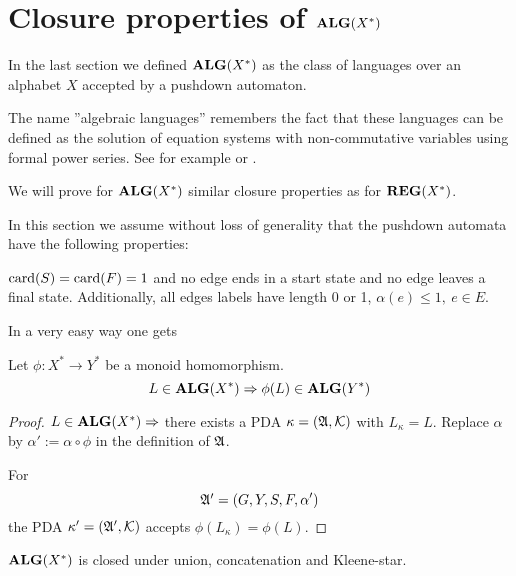 \section{Closure properties of $\mbox{{\bf ALG}}(X^*)$}

In the last section we defined $\mbox{{\bf ALG}}(X^*)$ as the class of languages over an
alphabet $X$ accepted by a pushdown automaton.

The name ''algebraic languages'' remembers the fact that these languages can be
defined as the solution of equation systems with non-commutative variables using
formal power series. See for example \cite{SaSo} or \cite{Berstel77}.

We will prove for $\mbox{{\bf ALG}}(X^*)$ similar closure properties as for $\mbox{{\bf REG}}(X^*)$.

In this section we assume without loss of generality that the pushdown automata
have the following properties:

$\mathrm{card}({S}) = \mathrm{card}({F}) = 1$ and no edge ends in a start state and no edge leaves a
final state. Additionally, all edges labels have length 0 or 1, $\alpha(e) \leq
1,\ e \in E$.

In a very easy way one gets

\begin{theorem}
\label{alg-lang-closure-hom}
Let $\phi : X^* \to Y^*$ be a monoid homomorphism.
\[ L \in \mbox{{\bf ALG}}(X^*) \Rightarrow \phi(L) \in \mbox{{\bf ALG}}(Y^*) \]
\end{theorem} 

\begin{proof}
$L \in \mbox{{\bf ALG}}(X^*) \Rightarrow$ there exists a PDA $\kappa = (\mbox{$\mathfrak{A}$}, \mbox{$\mathcal{K}$})$
with $L_{\kappa} = L$. Replace $\alpha$ by $\alpha' := \alpha \circ \phi$ in
the definition of $\mbox{$\mathfrak{A}$}$. 

For
\[ \mbox{$\mathfrak{A'}$} = (G, Y, S, F, \alpha') \]
the PDA $\kappa' = (\mbox{$\mathfrak{A'}$}, \mbox{$\mathcal{K}$})$ accepts $\phi(L_{\kappa}) = \phi(L)$.
\end{proof}


\bigskip
\begin{theorem}
$\mbox{{\bf ALG}}(X^*)$ is closed under union, concatenation and Kleene-star.
\end{theorem}

